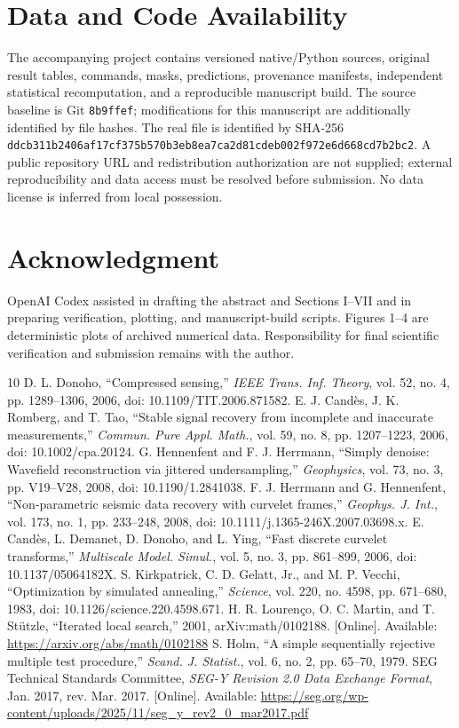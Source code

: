 \documentclass[journal]{IEEEtran}
\begin{document}
\section*{Data and Code Availability}
The accompanying project contains versioned native/Python sources, original result tables, commands, masks, predictions, provenance manifests, independent statistical recomputation, and a reproducible manuscript build. The source baseline is Git \texttt{8b9ffef}; modifications for this manuscript are additionally identified by file hashes. The real file is identified by SHA-256 \texttt{ddcb311b2406af17}\allowbreak\texttt{cf375b570b3eb8ea}\allowbreak\texttt{7ca2d81cdeb002f97}\allowbreak\texttt{2e6d668cd7b2bc2}. A public repository URL and redistribution authorization are not supplied; external reproducibility and data access must be resolved before submission. No data license is inferred from local possession.

\section*{Acknowledgment}
OpenAI Codex assisted in drafting the abstract and Sections I--VII and in preparing verification, plotting, and manuscript-build scripts. Figures 1--4 are deterministic plots of archived numerical data. Responsibility for final scientific verification and submission remains with the author.

\begin{thebibliography}{10}
 D. L. Donoho, ``Compressed sensing,'' \emph{IEEE Trans. Inf. Theory}, vol. 52, no. 4, pp. 1289--1306, 2006, doi: 10.1109/TIT.2006.871582.
 E. J. Cand\`es, J. K. Romberg, and T. Tao, ``Stable signal recovery from incomplete and inaccurate measurements,'' \emph{Commun. Pure Appl. Math.}, vol. 59, no. 8, pp. 1207--1223, 2006, doi: 10.1002/cpa.20124.
 G. Hennenfent and F. J. Herrmann, ``Simply denoise: Wavefield reconstruction via jittered undersampling,'' \emph{Geophysics}, vol. 73, no. 3, pp. V19--V28, 2008, doi: 10.1190/1.2841038.
 F. J. Herrmann and G. Hennenfent, ``Non-parametric seismic data recovery with curvelet frames,'' \emph{Geophys. J. Int.}, vol. 173, no. 1, pp. 233--248, 2008, doi: 10.1111/j.1365-246X.2007.03698.x.
 E. Cand\`es, L. Demanet, D. Donoho, and L. Ying, ``Fast discrete curvelet transforms,'' \emph{Multiscale Model. Simul.}, vol. 5, no. 3, pp. 861--899, 2006, doi: 10.1137/05064182X.
 S. Kirkpatrick, C. D. Gelatt, Jr., and M. P. Vecchi, ``Optimization by simulated annealing,'' \emph{Science}, vol. 220, no. 4598, pp. 671--680, 1983, doi: 10.1126/science.220.4598.671.
 H. R. Louren\c{c}o, O. C. Martin, and T. St\"utzle, ``Iterated local search,'' 2001, arXiv:math/0102188. [Online]. Available: \url{https://arxiv.org/abs/math/0102188}
 S. Holm, ``A simple sequentially rejective multiple test procedure,'' \emph{Scand. J. Statist.}, vol. 6, no. 2, pp. 65--70, 1979.
 SEG Technical Standards Committee, \emph{SEG-Y Revision 2.0 Data Exchange Format}, Jan. 2017, rev. Mar. 2017. [Online]. Available: \url{https://seg.org/wp-content/uploads/2025/11/seg_y_rev2_0_mar2017.pdf}
\end{thebibliography}
\end{document}
